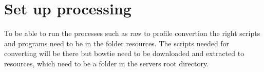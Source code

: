 \section{Set up processing}
To be able to run the processes such as raw to profile convertion the right scripts and programs need to be in the folder resources. The scripts needed for converting will be there but bowtie need to be downloaded and extracted to resources, which need to be a folder in the servers root directory.